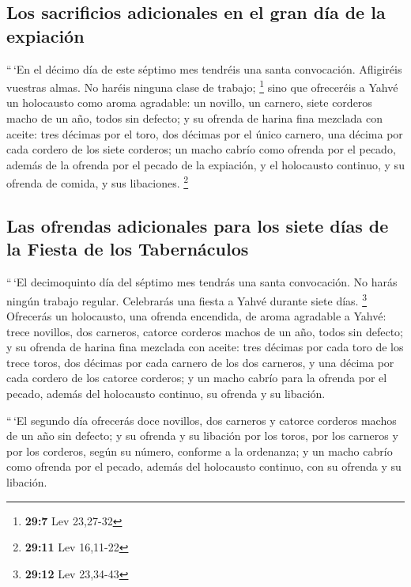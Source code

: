 \begin{paracol}{2}
\hypertarget{los-sacrificios-adicionales-en-el-gran-duxeda-de-la-expiaciuxf3n}{%
\subsection{Los sacrificios adicionales en el gran día de la
expiación}\label{los-sacrificios-adicionales-en-el-gran-duxeda-de-la-expiaciuxf3n}}

 ``\,`En el décimo día de este séptimo mes tendréis una
santa convocación. Afligiréis vuestras almas. No haréis ninguna clase de
trabajo; \footnote{\textbf{29:7} Lev 23,27-32}  sino que
ofreceréis a Yahvé un holocausto como aroma agradable: un novillo, un
carnero, siete corderos macho de un año, todos sin defecto;
 y su ofrenda de harina fina mezclada con aceite: tres
décimas por el toro, dos décimas por el único carnero, 
una décima por cada cordero de los siete corderos;  un
macho cabrío como ofrenda por el pecado, además de la ofrenda por el
pecado de la expiación, y el holocausto continuo, y su ofrenda de
comida, y sus libaciones. \footnote{\textbf{29:11} Lev 16,11-22}

\hypertarget{las-ofrendas-adicionales-para-los-siete-duxedas-de-la-fiesta-de-los-tabernuxe1culos}{%
\subsection{Las ofrendas adicionales para los siete días de la Fiesta de
los
Tabernáculos}\label{las-ofrendas-adicionales-para-los-siete-duxedas-de-la-fiesta-de-los-tabernuxe1culos}}

 ``\,`El decimoquinto día del séptimo mes tendrás una
santa convocación. No harás ningún trabajo regular. Celebrarás una
fiesta a Yahvé durante siete días. \footnote{\textbf{29:12} Lev 23,34-43}
 Ofrecerás un holocausto, una ofrenda encendida, de aroma
agradable a Yahvé: trece novillos, dos carneros, catorce corderos machos
de un año, todos sin defecto;  y su ofrenda de harina
fina mezclada con aceite: tres décimas por cada toro de los trece toros,
dos décimas por cada carnero de los dos carneros,  y una
décima por cada cordero de los catorce corderos;  y un
macho cabrío para la ofrenda por el pecado, además del holocausto
continuo, su ofrenda y su libación.

 ``\,`El segundo día ofrecerás doce novillos, dos
carneros y catorce corderos machos de un año sin defecto;
 y su ofrenda y su libación por los toros, por los
carneros y por los corderos, según su número, conforme a la ordenanza;
 y un macho cabrío como ofrenda por el pecado, además del
holocausto continuo, con su ofrenda y su libación.


\end{paracol}
